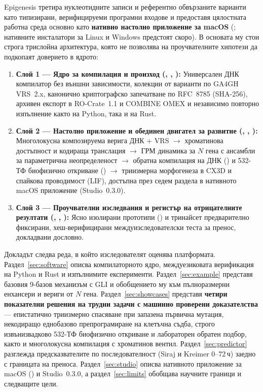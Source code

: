 \documentclass[10.5pt,a4paper]{article}
\begin{document}
Epigenesis третира нуклеотидните записи и референтно обвързаните варианти като типизирани, верифицируеми програмни входове и предоставя цялостната работна среда основно като \textbf{нативно настолно приложение за macOS} (; нативните инсталатори за Linux и Windows предстоят скоро\texttrademark). В основата му стои строга трислойна архитектура, която не позволява на проучвателните хипотези да подкопаят доверието в ядрото:
\begin{enumerate}
\item \textbf{Слой 1 — Ядро за компилация и произход (, , ):} Универсален ДНК компилатор без външни зависимости, колекции от варианти по GA4GH VRS~2.x, канонично криптографско запечатване по RFC~8785 (SHA-256), архивен експорт в RO-Crate~1.1 и COMBINE OMEX и независимо повторно изпълнение както на Python, така и на Rust.
\item \textbf{Слой 2 — Настолно приложение и обединен двигател за развитие (, , ):} Многолокусна композируема верига ДНК + VRS $\rightarrow$ хроматинова достъпност и кодираща транслация $\rightarrow$ ГРМ динамика за $N$ гена с ансамбли за параметрична неопределеност $\rightarrow$ обратна компилация на ДНК () и 532-ТФ биофизично откриване () $\rightarrow$ триизмерна морфогенеза в CX3D и спайкова проводимост (LIF), достъпна през седем раздела в нативното macOS приложение (Studio~0.3.0).
\item \textbf{Слой 3 — Проучвателни изследвания и регистър на отрицателните резултати (, , ):} Ясно изолирани прототипи () и тринайсет предварително фиксирани, хеш-верифицирани междуизследователски теста за пренос, докладвани дословно.
\end{enumerate}

Докладът следва реда, в който изследователят оценява платформата. Раздел~\ref{sec:software} описва компилаторното ядро, междуезиковата верификация на Python и Rust и изпълнимите експерименти. Раздел~\ref{sec:example} представя базовия 9-базов механизъм с GLI и обобщението му към пълноразмерни енхансери и вериги от $N$ гена. Раздел~\ref{sec:showcases} представя \textbf{четири показателни решения на трудни задачи с машинно проверени доказателства} — епистатично триизмерно спасяване при запазена първична мутация, некодиращо еднобазово препрограмиране на клетъчна съдба, строго извънизвадково 532-ТФ биофизично откриване и лабораторен обратен подбор, както и многолокусна компилация с хроматинов вентил. Раздел~\ref{sec:predictor} разглежда предсказвателите по последователност (Siraj и Kreimer 0--72\,ч) заедно с границата на преноса. Раздел~\ref{sec:studio} описва нативното приложение за macOS () и Studio~0.3.0, а раздел~\ref{sec:limits} обобщава научните граници и следващите цели.
\end{document}
